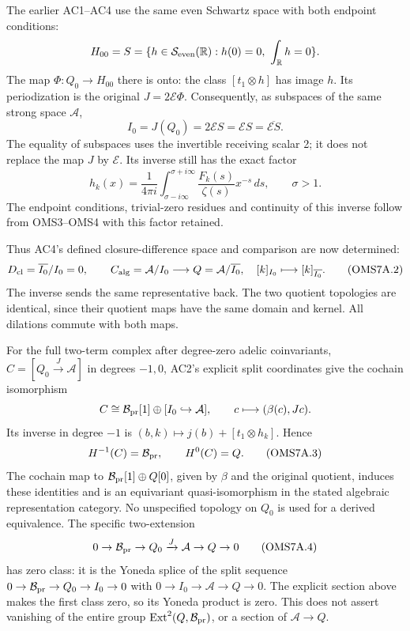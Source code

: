 The earlier AC1--AC4 use the same even Schwartz space with both endpoint
conditions: \[
H_{00}=S=\{h\in\mathcal S_{\rm even}(\mathbb R):h(0)=0,\ \int_{\mathbb R}h=0\}.
\] The map \(\Phi:Q_0\to H_{00}\) there is onto: the class
\([t_1\otimes h]\) has image \(h\). Its periodization is the original
\(J=2\mathcal E\Phi\). Consequently, as subspaces of the same strong
space \(\mathcal A\), \[
I_0=J(Q_0)=2\mathcal ES=\mathcal ES=\overline{\mathcal ES}.
\tag{OMS7A.1}
\] The equality of subspaces uses the invertible receiving scalar 2; it
does not replace the map \(J\) by \(\mathcal E\). Its inverse still has
the exact factor \[
h_k(x)=\frac1{4\pi i}\int_{\sigma-i\infty}^{\sigma+i\infty}
\frac{F_k(s)}{\zeta(s)}x^{-s}\,ds,\qquad \sigma>1.
\] The endpoint conditions, trivial-zero residues and continuity of this
inverse follow from OMS3--OMS4 with this factor retained.

Thus AC4's defined closure-difference space and comparison are now
determined: \[
D_{\rm cl}=\overline{I_0}/I_0=0,\qquad
C_{\rm alg}=\mathcal A/I_0\longrightarrow Q=\mathcal A/\overline{I_0},
\quad[k]_{I_0}\longmapsto[k]_{\overline{I_0}}.
\tag{OMS7A.2}
\] The inverse sends the same representative back. The two quotient
topologies are identical, since their quotient maps have the same domain
and kernel. All dilations commute with both maps.

For the full two-term complex after degree-zero adelic coinvariants,
\(C=[Q_0\xrightarrow{J}\mathcal A]\) in degrees \(-1,0\), AC2's explicit
split coordinates give the cochain isomorphism \[
C\cong\mathcal B_{\rm pr}[1]\oplus[I_0\hookrightarrow\mathcal A],
\qquad c\longmapsto(\beta(c),Jc).
\] Its inverse in degree \(-1\) is
\((b,k)\mapsto j(b)+[t_1\otimes h_k]\). Hence \[
H^{-1}(C)=\mathcal B_{\rm pr},\qquad H^0(C)=Q.
\tag{OMS7A.3}
\] The cochain map to \(\mathcal B_{\rm pr}[1]\oplus Q[0]\), given by
\(\beta\) and the original quotient, induces these identities and is an
equivariant quasi-isomorphism in the stated algebraic representation
category. No unspecified topology on \(Q_0\) is used for a derived
equivalence. The specific two-extension \[
0\to\mathcal B_{\rm pr}\to Q_0\xrightarrow{J}\mathcal A\to Q\to0
\tag{OMS7A.4}
\] has zero class: it is the Yoneda splice of the split sequence
\(0\to\mathcal B_{\rm pr}\to Q_0\to I_0\to0\) with
\(0\to I_0\to\mathcal A\to Q\to0\). The explicit section above makes the
first class zero, so its Yoneda product is zero. This does not assert
vanishing of the entire group
\(\operatorname{Ext}^2(Q,\mathcal B_{\rm pr})\), or a section of
\(\mathcal A\to Q\).

